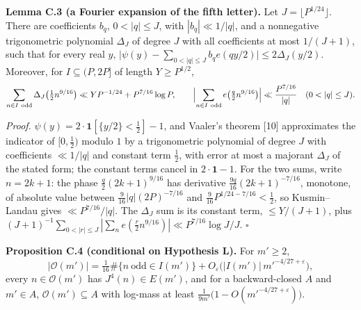 \documentclass[11pt,a4paper]{article}
\begin{document}
\textbf{Lemma C.3 (a Fourier expansion of the fifth letter).} Let
\(J=\lfloor P^{1/24}\rfloor\). There are coefficients \(b_q\),
\(0<|q|\le J\), with \(|b_q|\ll 1/|q|\), and a nonnegative trigonometric
polynomial \(\Delta_J\) of degree \(J\) with all coefficients at most
\(1/(J+1)\), such that for every real \(y\),
\(\bigl|\psi(y)-\sum_{0<|q|\le J}b_qe(qy/2)\bigr|\le 2\Delta_J(y/2)\).
Moreover, for \(I\subseteq(P,2P]\) of length \(Y\ge P^{1/2}\), \[
\sum_{n\in I\ \mathrm{odd}}\Delta_J\bigl(\tfrac12n^{9/16}\bigr)\ll YP^{-1/24}+P^{7/16}\log P,
\qquad
\Bigl|\sum_{n\in I\ \mathrm{odd}}e\bigl(\tfrac q2n^{9/16}\bigr)\Bigr|\ll\frac{P^{7/16}}{|q|}\quad(0<|q|\le J).
\]

\emph{Proof.} \(\psi(y)=2\cdot\mathbf 1[\{y/2\}<\tfrac12]-1\), and
Vaaler's theorem {[}10{]} approximates the indicator of \([0,\tfrac12)\)
modulo \(1\) by a trigonometric polynomial of degree \(J\) with
coefficients \(\ll 1/|q|\) and constant term \(\tfrac12\), with error at
most a majorant \(\Delta_J\) of the stated form; the constant terms
cancel in \(2\cdot\mathbf 1-1\). For the two sums, write \(n=2k+1\): the
phase \(\tfrac q2(2k+1)^{9/16}\) has derivative
\(\tfrac{9q}{16}(2k+1)^{-7/16}\), monotone, of absolute value between
\(\tfrac9{16}|q|(2P)^{-7/16}\) and
\(\tfrac9{16}P^{1/24-7/16}<\tfrac12\), so Kusmin--Landau gives
\(\ll P^{7/16}/|q|\). The \(\Delta_J\) sum is its constant term,
\(\le Y/(J+1)\), plus
\((J+1)^{-1}\sum_{0<|r|\le J}|\sum_ne(\tfrac r2n^{9/16})|\ll P^{7/16}\log J/J\).
\(\square\)

\textbf{Proposition C.4 (conditional on Hypothesis L).} For \(m'\ge 2\),
\[
|\mathcal O(m')|=\tfrac1{16}\#\{n\ \text{odd}\in I(m')\}+O_\varepsilon\bigl(|I(m')|\,m'^{-4/27+\varepsilon}\bigr),
\] every \(n\in\mathcal O(m')\) has \(J^4(n)\in E(m')\), and for a
backward-closed \(A\) and \(m'\in A\), \(\mathcal O(m')\subseteq A\)
with log-mass at least
\(\frac1{9m'}\bigl(1-O(m'^{-4/27+\varepsilon})\bigr)\).
\end{document}
